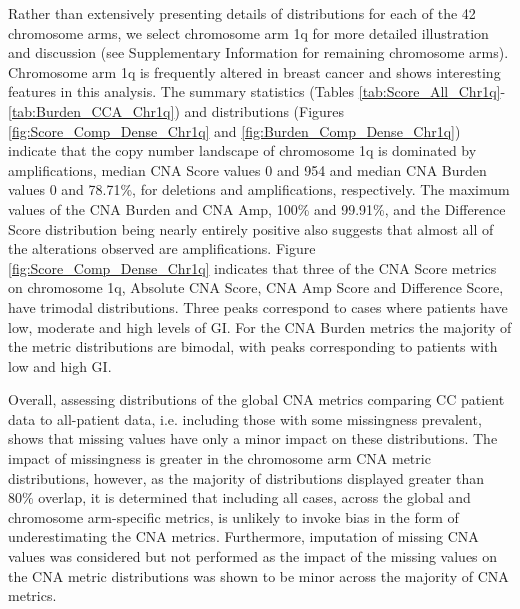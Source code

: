 Rather than extensively presenting details of distributions for each of the 42 chromosome arms, we select chromosome arm 1q for more detailed illustration and discussion (see Supplementary Information for remaining chromosome arms). Chromosome arm 1q is frequently altered in breast cancer and shows interesting features in this analysis. The summary statistics (Tables \ref{tab:Score_All_Chr1q}-\ref{tab:Burden_CCA_Chr1q}) and distributions (Figures \ref{fig:Score_Comp_Dense_Chr1q} and \ref{fig:Burden_Comp_Dense_Chr1q}) indicate that the copy number landscape of chromosome 1q is dominated by amplifications, median CNA Score values 0 and 954 and median CNA Burden values 0 and 78.71\%, for deletions and amplifications, respectively. The maximum values of the CNA Burden and CNA Amp, 100\% and 99.91\%, and the Difference Score distribution being nearly entirely positive also suggests that almost all of the alterations observed are amplifications. Figure \ref{fig:Score_Comp_Dense_Chr1q} indicates that three of the CNA Score metrics on chromosome 1q, Absolute CNA Score, CNA Amp Score and Difference Score, have trimodal distributions. Three peaks correspond to cases where patients have low, moderate and high levels of GI. For the CNA Burden metrics the majority of the metric distributions are bimodal, with peaks corresponding to patients with low and high GI. 

Overall, assessing distributions of the global CNA metrics comparing CC patient data to all-patient data, i.e. including those with some missingness prevalent, shows that missing values have only a minor impact on these distributions. The impact of missingness is greater in the chromosome arm CNA metric distributions, however, as the majority of distributions displayed greater than 80\% overlap, it is determined that including all cases, across the global and chromosome arm-specific metrics, is unlikely to invoke bias in the form of underestimating the CNA metrics. Furthermore, imputation of missing CNA values was considered but not performed as the impact of the missing values on the CNA metric distributions was shown to be minor across the majority of CNA metrics.

